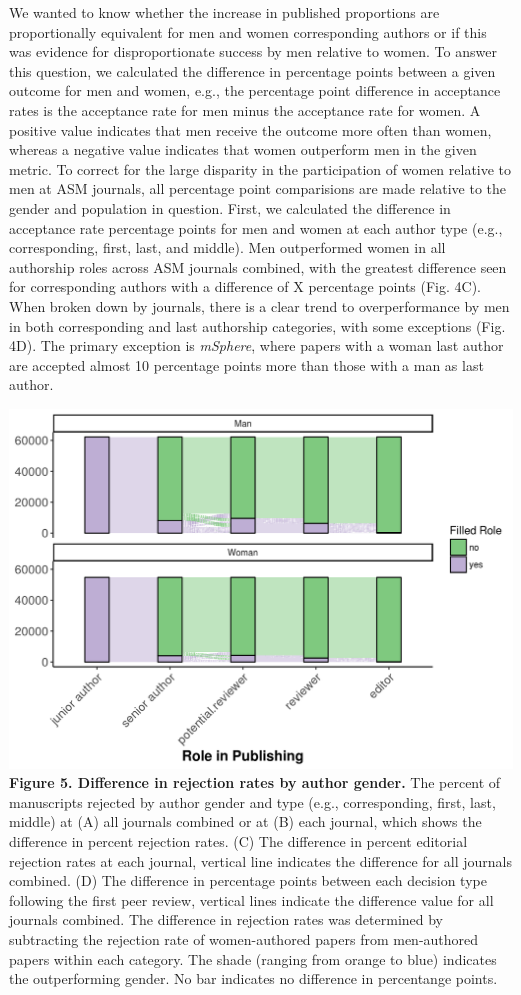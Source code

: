 \documentclass[11pt,]{article}
\begin{document}
We wanted to know whether the increase in published proportions are
proportionally equivalent for men and women corresponding authors or if
this was evidence for disproportionate success by men relative to women.
To answer this question, we calculated the difference in percentage
points between a given outcome for men and women, e.g., the percentage
point difference in acceptance rates is the acceptance rate for men
minus the acceptance rate for women. A positive value indicates that men
receive the outcome more often than women, whereas a negative value
indicates that women outperform men in the given metric. To correct for
the large disparity in the participation of women relative to men at ASM
journals, all percentage point comparisions are made relative to the
gender and population in question. First, we calculated the difference
in acceptance rate percentage points for men and women at each author
type (e.g., corresponding, first, last, and middle). Men outperformed
women in all authorship roles across ASM journals combined, with the
greatest difference seen for corresponding authors with a difference of
X percentage points (Fig. 4C). When broken down by journals, there is a
clear trend to overperformance by men in both corresponding and last
authorship categories, with some exceptions (Fig. 4D). The primary
exception is \emph{mSphere}, where papers with a woman last author are
accepted almost 10 percentage points more than those with a man as last
author.

\includegraphics{Figure_5.png} \textbf{Figure 5. Difference in rejection
rates by author gender.} The percent of manuscripts rejected by author
gender and type (e.g., corresponding, first, last, middle) at (A) all
journals combined or at (B) each journal, which shows the difference in
percent rejection rates. (C) The difference in percent editorial
rejection rates at each journal, vertical line indicates the difference
for all journals combined. (D) The difference in percentage points
between each decision type following the first peer review, vertical
lines indicate the difference value for all journals combined. The
difference in rejection rates was determined by subtracting the
rejection rate of women-authored papers from men-authored papers within
each category. The shade (ranging from orange to blue) indicates the
outperforming gender. No bar indicates no difference in percentange
points.
\end{document}
